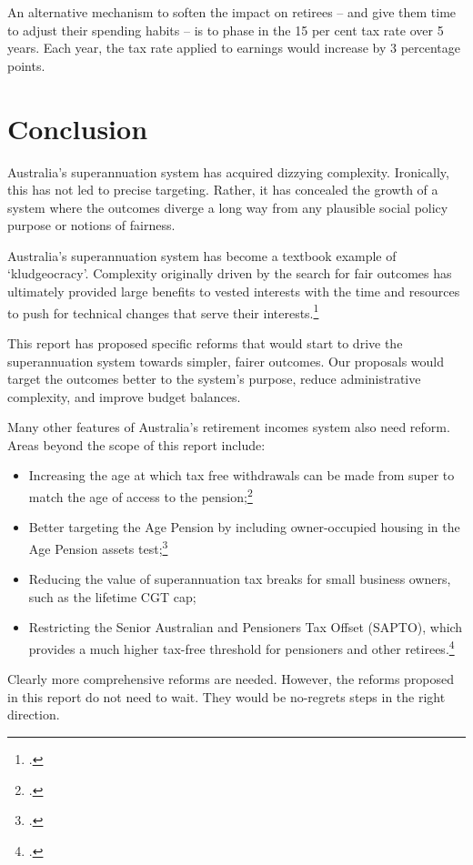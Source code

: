 An alternative mechanism to soften the impact on retirees – and give them time to adjust their spending habits – is to phase in the 15 per cent tax rate over 5 years. Each year, the tax rate applied to earnings would increase by 3 percentage points.

\chapter{Conclusion}
Australia’s superannuation system has acquired dizzying complexity. Ironically, this has not led to precise targeting. Rather, it has concealed the growth of a system where the outcomes diverge a long way from any plausible social policy purpose or notions of fairness.

Australia’s superannuation system has become a textbook example of ‘kludgeocracy’. Complexity originally driven by the search for fair outcomes has ultimately provided large benefits to vested interests with the time and resources to push for technical changes that serve their interests.\footcite{Teles2013} 

This report has proposed specific reforms that would start to drive the superannuation system towards simpler, fairer outcomes. Our proposals would target the outcomes better to the system’s purpose, reduce administrative complexity, and improve budget balances.

Many other features of Australia’s retirement incomes system also need reform. Areas beyond the scope of this report include: 
\begin{itemize}
\item	Increasing the age at which tax free withdrawals can be made from super to match the age of access to the pension;\footcite[][29]{DaleyMcGannonSavageEtAl2013BalancingBudgets} 
\item	Better targeting the Age Pension by including owner-occupied housing in the Age Pension assets test;\footcite[][37]{DaleyMcGannonSavageEtAl2013BalancingBudgets} 
\item	Reducing the value of superannuation tax breaks for small business owners, such as the lifetime CGT cap; 
\item	Restricting the Senior Australian and Pensioners Tax Offset (SAPTO), which provides a much higher tax-free threshold for pensioners and other retirees.\footcite{ACOSS2015--Sub-to-Govt-Retirement-Incomes-Review} 
\end{itemize} 
Clearly more comprehensive reforms are needed. However, the reforms proposed in this report do not need to wait. They would be no-regrets steps in the right direction. 





